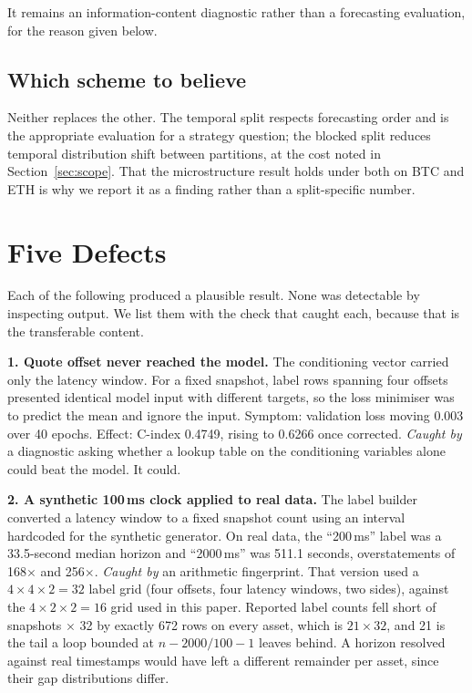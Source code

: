 \documentclass[11pt]{article}
\begin{document}
It remains an information-content diagnostic rather than a forecasting
evaluation, for the reason given below.

\subsection{Which scheme to believe}

Neither replaces the other. The temporal split respects forecasting order and
is the appropriate evaluation for a strategy question; the blocked split
reduces temporal distribution shift between partitions, at the cost noted in
Section~\ref{sec:scope}. That the microstructure result holds under both on BTC
and ETH is why we report it as a finding rather than a split-specific
number.

\section{Five Defects}
\label{sec:defects}

Each of the following produced a plausible result. None was detectable by
inspecting output. We list them with the check that caught each, because that
is the transferable content.

\textbf{1. Quote offset never reached the model.} The conditioning vector
carried only the latency window. For a fixed snapshot, label rows spanning four
offsets presented identical model input with different targets, so the loss
minimiser was to predict the mean and ignore the input. Symptom: validation
loss moving 0.003 over 40 epochs. Effect: C-index 0.4749, rising to 0.6266 once
corrected. \emph{Caught by} a diagnostic asking whether a lookup table on the
conditioning variables alone could beat the model. It could.

\textbf{2. A synthetic 100\,ms clock applied to real data.} The label builder
converted a latency window to a fixed snapshot count using an interval
hardcoded for the synthetic generator. On real data, the ``200\,ms'' label was
a 33.5-second median horizon and ``2000\,ms'' was 511.1 seconds, overstatements
of 168$\times$ and 256$\times$. \emph{Caught by} an arithmetic fingerprint. That version used a
$4 \times 4 \times 2 = 32$ label grid (four offsets, four latency windows, two
sides), against the $4 \times 2 \times 2 = 16$ grid used in this paper. Reported
label counts fell short of snapshots $\times$ 32 by exactly 672 rows on every
asset, which is $21 \times 32$, and 21 is the tail a loop bounded at
$n - 2000/100 - 1$ leaves behind. A horizon resolved against real timestamps
would have left a different remainder per asset, since their gap distributions
differ.
\end{document}
